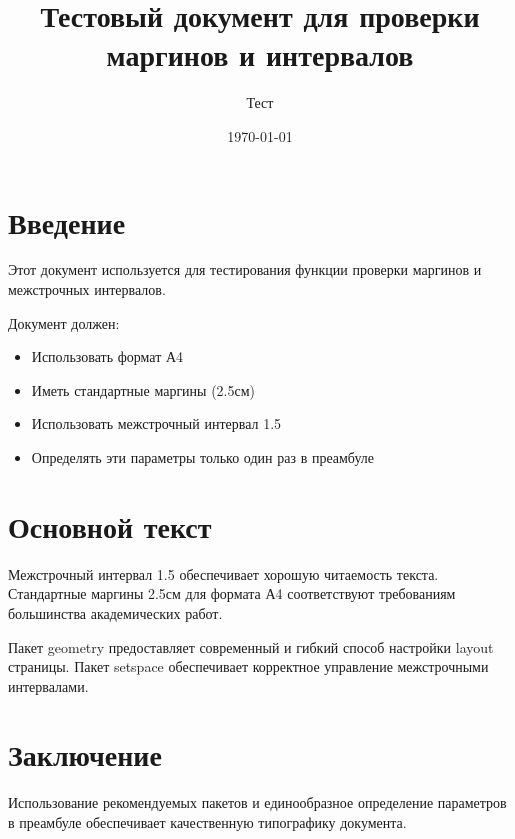 \documentclass[12pt,a4paper]{article}
\begin{document}
\title{Тестовый документ для проверки маргинов и интервалов}
\author{Тест}
\date{\today}
\maketitle

\section{Введение}

Этот документ используется для тестирования функции проверки маргинов и межстрочных интервалов. 

Документ должен:
\begin{itemize}
    \item Использовать формат А4
    \item Иметь стандартные маргины (2.5см)
    \item Использовать межстрочный интервал 1.5
    \item Определять эти параметры только один раз в преамбуле
\end{itemize}

\section{Основной текст}

Межстрочный интервал 1.5 обеспечивает хорошую читаемость текста. Стандартные маргины 2.5см для формата А4 соответствуют требованиям большинства академических работ.

Пакет geometry предоставляет современный и гибкий способ настройки layout страницы. Пакет setspace обеспечивает корректное управление межстрочными интервалами.

\section{Заключение}

Использование рекомендуемых пакетов и единообразное определение параметров в преамбуле обеспечивает качественную типографику документа.
\end{document}
